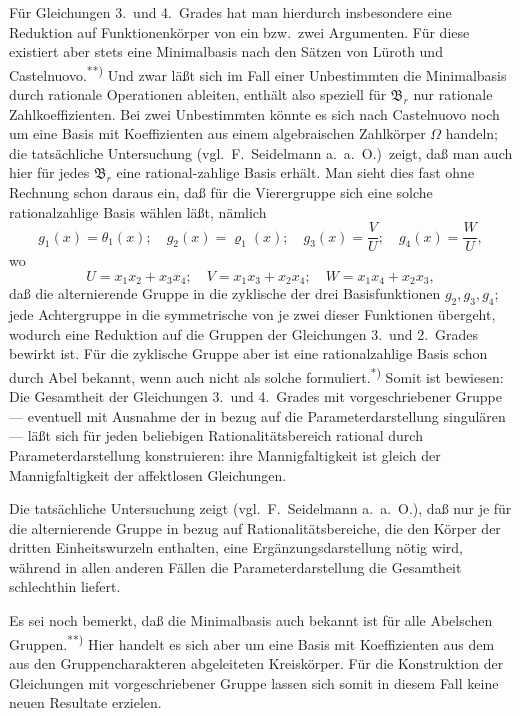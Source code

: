 \documentclass[12pt,a4paper]{article}
\begin{document}
F\"ur Gleichungen 3.\ und 4.\ Grades hat man hierdurch insbesondere eine Reduktion auf Funktionenk\"orper von ein bzw.\ zwei Argumenten. F\"ur diese existiert aber stets eine Minimalbasis nach den S\"atzen von L\"uroth und Castelnuovo.\textsuperscript{**)} Und zwar l\"a\ss{}t sich im Fall einer Unbestimmten die Minimalbasis durch rationale Operationen ableiten, enth\"alt also speziell f\"ur $\mathfrak{B}_{r}$ nur rationale Zahlkoeffizienten. Bei zwei Unbestimmten k\"onnte es sich nach Castelnuovo noch um eine Basis mit Koeffizienten aus einem algebraischen Zahlk\"orper $\Omega$ handeln; die tats\"achliche Untersuchung (vgl.\ F.\ Seidelmann a.\ a.\ O.)\ zeigt, da\ss{} man auch hier f\"ur jedes $\mathfrak{B}_{r}$ eine rational-zahlige Basis erh\"alt. Man sieht dies fast ohne Rechnung schon daraus ein, da\ss{} f\"ur die Vierergruppe sich eine solche rationalzahlige Basis w\"ahlen l\"a\ss{}t, n\"amlich
\[
g_{1}(x)=\theta_{1}(x);\quad g_{2}(x)=\varrho_{1}(x);\quad g_{3}(x)=\frac{V}{U};\quad g_{4}(x)=\frac{W}{U},
\]
wo
\[
U=x_{1}x_{2}+x_{3}x_{4};\quad V=x_{1}x_{3}+x_{2}x_{4};\quad W=x_{1}x_{4}+x_{2}x_{3},
\]
da\ss{} die alternierende Gruppe in die zyklische der drei Basisfunktionen $g_{2},g_{3},g_{4}$; jede Achtergruppe in die symmetrische von je zwei dieser Funktionen \"ubergeht, wodurch eine Reduktion auf die Gruppen der Gleichungen 3.\ und 2.\ Grades bewirkt ist. F\"ur die zyklische Gruppe aber ist eine rationalzahlige Basis schon durch Abel bekannt, wenn auch nicht als solche formuliert.\textsuperscript{*)} Somit ist bewiesen: Die Gesamtheit der Gleichungen 3.\ und 4.\ Grades mit vorgeschriebener Gruppe --- eventuell mit Ausnahme der in bezug auf die Parameterdarstellung singul\"aren --- l\"a\ss{}t sich f\"ur jeden beliebigen Rationalit\"atsbereich rational durch Parameterdarstellung konstruieren: ihre Mannigfaltigkeit ist gleich der Mannigfaltigkeit der affektlosen Gleichungen.

Die tats\"achliche Untersuchung zeigt (vgl.\ F.\ Seidelmann a.\ a.\ O.), da\ss{} nur je f\"ur die alternierende Gruppe in bezug auf Rationalit\"atsbereiche, die den K\"orper der dritten Einheitswurzeln enthalten, eine Erg\"anzungsdarstellung n\"otig wird, w\"ahrend in allen anderen F\"allen die Parameterdarstellung die Gesamtheit schlechthin liefert.

Es sei noch bemerkt, da\ss{} die Minimalbasis auch bekannt ist f\"ur alle Abelschen Gruppen.\textsuperscript{**)} Hier handelt es sich aber um eine Basis mit Koeffizienten aus dem aus den Gruppencharakteren abgeleiteten Kreisk\"orper. F\"ur die Konstruktion der Gleichungen mit vorgeschriebener Gruppe lassen sich somit in diesem Fall keine neuen Resultate erzielen.
\end{document}

